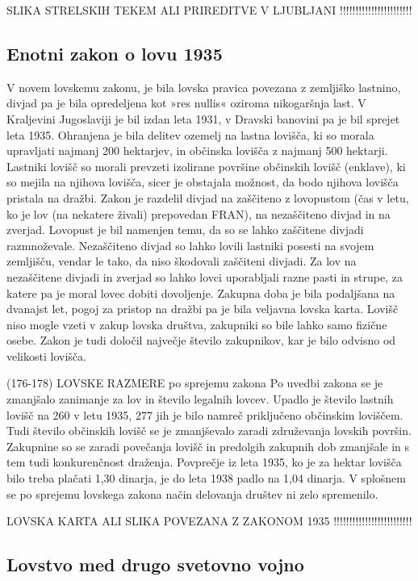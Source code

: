 \documentclass[a4paper,12pt,openright]{book}
\begin{document}
SLIKA STRELSKIH TEKEM ALI PRIREDITVE V LJUBLJANI !!!!!!!!!!!!!!!!!!!!!!!

\subsection{Enotni zakon o lovu 1935}
 
V novem lovskemu zakonu, je bila lovska pravica povezana z zemljiško lastnino, divjad pa je bila opredeljena kot »res nullis« oziroma nikogaršnja last.
V Kraljevini Jugoslaviji je bil izdan leta 1931, v Dravski banovini pa je bil sprejet leta 1935. 
Ohranjena je bila delitev ozemelj na lastna lovišča, ki so morala upravljati najmanj 200 hektarjev, in občinska lovišča z najmanj 500 hektarji.
Lastniki lovišč so morali prevzeti izolirane površine občinskih lovišč (enklave), ki so mejila na njihova lovišča, sicer je obstajala možnost, da bodo njihova lovišča pristala na dražbi. 
Zakon je razdelil divjad na zaščiteno z lovopustom (čas v letu, ko je lov (na nekatere živali) prepovedan FRAN), na nezaščiteno divjad in na zverjad. 
Lovopust je bil namenjen temu, da so se lahko zaščitene divjadi razmnoževale. 
Nezaščiteno divjad so lahko lovili lastniki posesti na svojem zemljišču, vendar le tako, da niso škodovali zaščiteni divjadi.
Za lov na nezaščitene divjadi in zverjad so lahko lovci uporabljali razne pasti in strupe, za katere pa je moral lovec dobiti dovoljenje.
Zakupna doba je bila podaljšana na dvanajst let, pogoj za pristop na dražbi pa je bila veljavna lovska karta.
Lovišč niso mogle vzeti v zakup lovska društva, zakupniki so bile lahko samo fizične osebe. Zakon je tudi določil največje število zakupnikov, kar je bilo odvisno od velikosti lovišča.

(176-178) LOVSKE RAZMERE po sprejemu zakona
Po uvedbi zakona se je zmanjšalo zanimanje za lov in število legalnih lovcev.
Upadlo je število lastnih lovišč na 260 v letu 1935, 277 jih je bilo namreč priključeno občinskim loviščem.
Tudi število občinskih lovišč se je zmanjševalo zaradi združevanja lovskih površin. 
Zakupnine so se zaradi povečanja lovišč in predolgih zakupnih dob zmanjšale in s tem tudi konkurenčnost draženja.
Povprečje iz leta 1935, ko je za hektar lovišča bilo treba plačati 1,30 dinarja, je do leta 1938 padlo na 1,04 dinarja.
V splošnem se po sprejemu lovskega zakona način delovanja društev ni zelo spremenilo. 

LOVSKA KARTA ALI SLIKA POVEZANA Z ZAKONOM 1935 !!!!!!!!!!!!!!!!!!!!!!!!!

\subsection{Lovstvo med drugo svetovno vojno}
\end{document}

